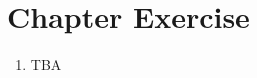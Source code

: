 \documentclass[../main.tex]{subfiles}
\begin{document}
    \section{Chapter Exercise}
    \begin{enumerate}
        \item TBA
    \end{enumerate}
\end{document}
